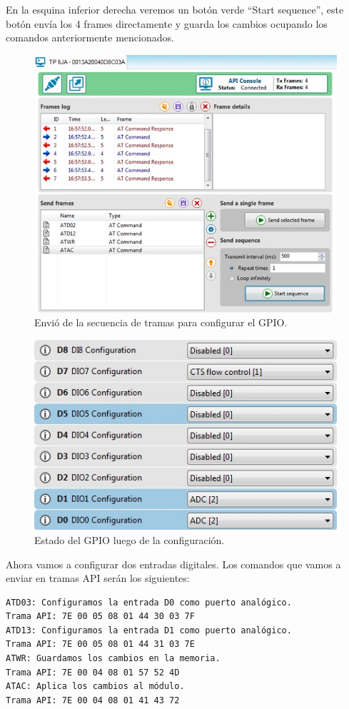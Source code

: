 \documentclass[11pt,oneside,spanish,a4paper]{article}
\begin{document}
En la esquina inferior derecha veremos un botón verde ``Start
sequence'', este botón envía los 4 frames directamente y guarda los
cambios ocupando los comandos anteriormente mencionados. 
\begin{figure}[h]
	\centering
	\includegraphics[width=.6\textwidth]{img/IMAGEN16.jpg}
	\caption{Envió de la secuencia de tramas para configurar el GPIO.}
\end{figure}
\begin{figure}[h]
	\centering
	\includegraphics[width=.6\textwidth]{img/IMAGEN17.jpg}
	\caption{Estado del GPIO luego de la configuración.}
\end{figure}

Ahora vamos a configurar dos entradas digitales.
Los comandos que vamos a enviar en tramas API serán los siguientes:
\begin{lstlisting}[emph={ATD03:,Trama API:,ATD13:,ATWR:,ATAC:}, emphstyle={\color{green}}, label=code:apiEjempl-id]
ATD03: Configuramos la entrada D0 como puerto analógico.
Trama API: 7E 00 05 08 01 44 30 03 7F
ATD13: Configuramos la entrada D1 como puerto analógico.
Trama API: 7E 00 05 08 01 44 31 03 7E
ATWR: Guardamos los cambios en la memoria.
Trama API: 7E 00 04 08 01 57 52 4D
ATAC: Aplica los cambios al módulo.
Trama API: 7E 00 04 08 01 41 43 72
\end{lstlisting} 
\end{document}
